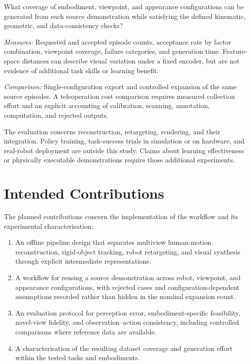 What coverage of embodiment, viewpoint, and appearance configurations can be
generated from each source demonstration while satisfying the defined
kinematic, geometric, and data-consistency checks?

\textit{Measures:} Requested and accepted episode counts, acceptance rate by
factor combination, viewpoint coverage, failure categories, and generation
time. Feature-space distances can describe visual variation under a fixed
encoder, but are not evidence of additional task skills or learning benefit.

\textit{Comparison:} Single-configuration export and controlled expansion of
the same source episodes. A teleoperation cost comparison requires measured
collection effort and an explicit accounting of calibration, scanning,
annotation, computation, and rejected outputs.

\medskip
\noindent The evaluation concerns reconstruction, retargeting, rendering, and
their integration. Policy training, task-success trials in simulation or on
hardware, and real-robot deployment are outside this study. Claims about
learning effectiveness or physically executable demonstrations require those
additional experiments.

\section{Intended Contributions}
\label{sec:contributions}

The planned contributions concern the implementation of the workflow and its
experimental characterisation:

\begin{enumerate}
  \item An offline pipeline design that separates multiview human-motion
        reconstruction, rigid-object tracking, robot retargeting, and visual
        synthesis through explicit intermediate representations.
  \item A workflow for reusing a source demonstration across robot,
        viewpoint, and appearance configurations, with rejected cases and
        configuration-dependent assumptions recorded rather than hidden in
        the nominal expansion count.
  \item An evaluation protocol for perception error, embodiment-specific
        feasibility, novel-view fidelity, and observation--action consistency,
        including controlled comparisons where reference data are available.
  \item A characterisation of the resulting dataset coverage and generation
        effort within the tested tasks and embodiments.
\end{enumerate}


